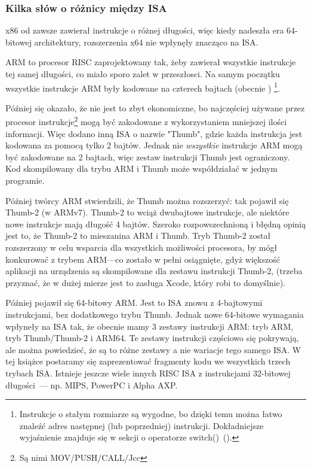 \subsubsection{Kilka słów o różnicy między \ac{ISA}}
x86 od zawsze  zawierał instrukcje o różnej długości, więc kiedy nadeszła era 64-bitowej architektury, rozszerzenia x64 nie wpłynęły znacząco na \ac{ISA}.

ARM to procesor \ac{RISC} zaprojektowany tak, żeby zawierał wszystkie instrukcje tej samej długości, co miało sporo zalet w przeszłosci.
Na samym początku wszystkie instrukcje ARM były kodowane na czterech bajtach (obecnie )%
\footnote{
Instrukcje o stałym rozmiarze są wygodne, bo dzięki temu można łatwo znaleźć adres następnej (lub poprzedniej) instrukcji. Dokładniejsze wyjaśnienie znajduje się w sekcji o operatorze switch()~().
}.

Później się okazało, że nie jest to zbyt ekonomiczne, bo najczęściej używane przez procesor instrukcje\footnote{Są nimi MOV/PUSH/CALL/Jcc} mogą być zakodowane z wykorzystaniem mniejszej ilości informacji.
Więc dodano inną \ac{ISA} o nazwie "Thumb", gdzie każda instrukcja jest kodowana za pomocą tylko 2 bajtów.
Jednak nie \emph{wszystkie} instrukcje ARM mogą być zakodowane na 2 bajtach, więc zestaw instrukcji Thumb jest ograniczony.
Kod skompilowany dla trybu ARM i Thumb może współdziałać w jednym programie.

Później twórcy ARM stwierdzili, że Thumb można rozszerzyć: tak pojawił się Thumb-2 (w ARMv7).
Thumb-2 to wciąż dwubajtowe instrukcje, ale niektóre nowe instrukcje mają długość 4 bajtów.
Szeroko rozpowszechnioną i błędną opinią jest to, że Thumb-2 to mieszanina ARM i Thumb.
Tryb Thumb-2 został rozszerzony w celu wsparcia dla wszystkich możliwości procesora, by mógł
konkurować z trybem ARM---co zostało w pełni osiągnięte, gdyż większość aplikacji na urządzenia \idevices są skompilowane dla
zestawu instrukcji Thumb-2, (trzeba przyznać, że w dużej mierze jest to zasługa Xcode, który robi to domyślnie).

Później pojawił się 64-bitowy ARM. Jest to \ac{ISA} znowu z 4-bajtowymi instrukcjami, bez dodatkowego trybu Thumb.
Jednak nowe 64-bitowe wymagania wpłyneły na \ac{ISA} tak, że obecnie mamy 3 zestawy instrukcji ARM: tryb ARM, tryb Thumb/Thumb-2 i ARM64.
Te zestawy instrukcji częściowo się pokrywają, ale można powiedzieć, że są to różne zestawy a nie wariacje tego samego \ac{ISA}.
W tej książce postaramy się zaprezentować fragmenty kodu we wszystkich trzech trybach \ac{ISA}.
%
%
%
Istnieje jeszcze wiele innych \ac{RISC} \ac{ISA} z instrukcjami 32-bitowej długości~--- np. MIPS, PowerPC i Alpha AXP.

